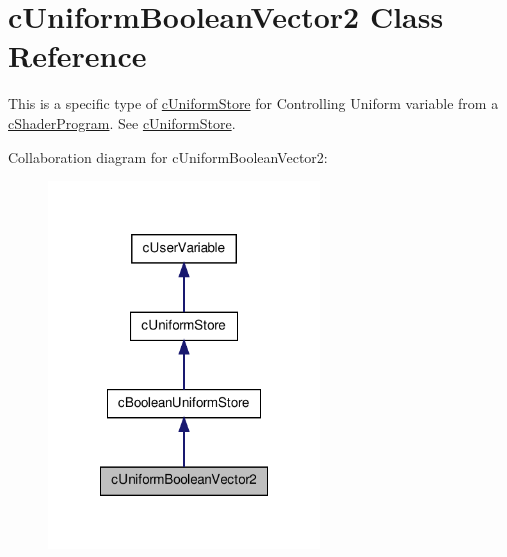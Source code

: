 \hypertarget{classc_uniform_boolean_vector2}{
\section{cUniformBooleanVector2 Class Reference}
\label{classc_uniform_boolean_vector2}
}


This is a specific type of \hyperlink{classc_uniform_store}{cUniformStore} for Controlling Uniform variable from a \hyperlink{classc_shader_program}{cShaderProgram}. See \hyperlink{classc_uniform_store}{cUniformStore}.  




Collaboration diagram for cUniformBooleanVector2:\nopagebreak
\begin{figure}[H]
\begin{center}
\leavevmode
\includegraphics[width=204pt]{classc_uniform_boolean_vector2__coll__graph}
\end{center}
\end{figure}
